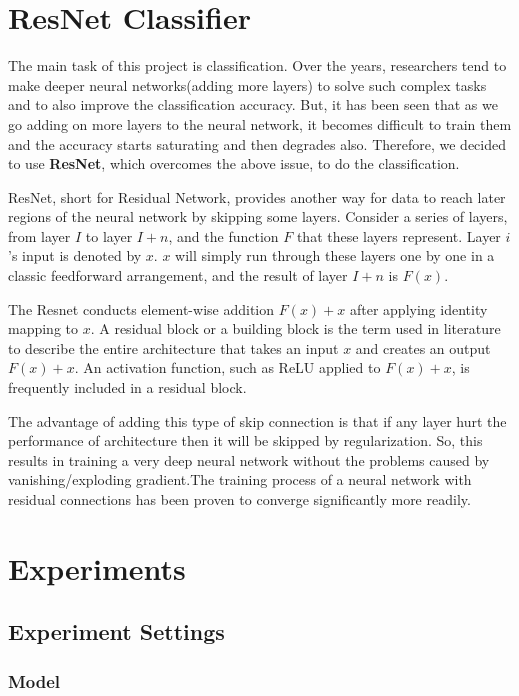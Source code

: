 \documentclass[11pt]{article}
\begin{document}
\section{ResNet Classifier}

The main task of this project is classification. Over the years, researchers tend to make deeper neural networks(adding more layers) to solve such complex tasks and to also improve the classification accuracy. But, it has been seen that as we go adding on more layers to the neural network, it becomes difficult to train them and the accuracy starts saturating and then degrades also. Therefore, we decided to use \textbf{ResNet}, which overcomes the above issue, to do the classification.

ResNet, short for Residual Network, provides another way for data to reach later regions of the neural network by skipping some layers. Consider a series of layers, from layer $I$ to layer $I + n$, and the function $F$ that these layers represent. Layer $i$'s input is denoted by $x$. $x$ will simply run through these layers one by one in a classic feedforward arrangement, and the result of layer $I + n$ is $F(x)$.

The Resnet conducts element-wise addition $F(x) + x$ after applying identity mapping to $x$. A residual block or a building block is the term used in literature to describe the entire architecture that takes an input $x$ and creates an output $F(x) + x$. An activation function, such as ReLU applied to $F(x) + x$, is frequently included in a residual block.

The advantage of adding this type of skip connection is that if any layer hurt the performance of architecture then it will be skipped by regularization. So, this results in training a very deep neural network without the problems caused by vanishing/exploding gradient.The training process of a neural network with residual connections has been proven to converge significantly more readily.


\section{Experiments}

\subsection{Experiment Settings}

\subsubsection{Model}
\end{document}
